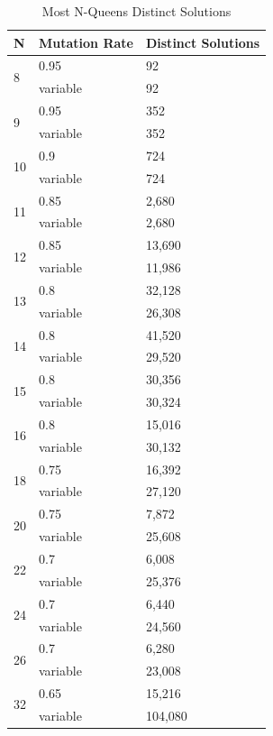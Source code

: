 \documentclass[conference]{IEEEtran}
\begin{document}
\begin{table}
\centering
\caption{Most N-Queens Distinct Solutions}
\begin{tabular}{|l|l|l|} \hline
N&               Mutation Rate&  Distinct Solutions\\ \hline
\multirow{2}{*}{8}&   0.95&           92\\
&                     variable&       92\\ \hline
\multirow{2}{*}{9}&   0.95&           352\\
&                     variable&       352\\ \hline
\multirow{2}{*}{10}&  0.9&            724\\
&                     variable&       724\\ \hline
\multirow{2}{*}{11}&  0.85&           2,680\\
&                     variable&       2,680\\ \hline
\multirow{2}{*}{12}&  0.85&           13,690\\
&                     variable&       11,986\\ \hline
\multirow{2}{*}{13}&  0.8&            32,128\\
&                     variable&       26,308\\ \hline
\multirow{2}{*}{14}&  0.8&            41,520\\
&                     variable&       29,520\\ \hline
\multirow{2}{*}{15}&  0.8&            30,356\\
&                     variable&       30,324\\ \hline
\multirow{2}{*}{16}&  0.8&            15,016\\
&                     variable&       30,132\\ \hline
\multirow{2}{*}{18}&  0.75&           16,392\\
&                     variable&       27,120\\ \hline
\multirow{2}{*}{20}&  0.75&           7,872\\
&                     variable&       25,608\\ \hline
\multirow{2}{*}{22}&  0.7&            6,008\\
&                     variable&       25,376\\ \hline
\multirow{2}{*}{24}&  0.7&            6,440\\
&                     variable&       24,560\\ \hline
\multirow{2}{*}{26}&  0.7&            6,280\\
&                     variable&       23,008\\ \hline
\multirow{2}{*}{32}&  0.65&           15,216\\
&                     variable&       104,080\\
\hline\end{tabular}
\label{table:mostsol}
\end{table}
\end{document}
